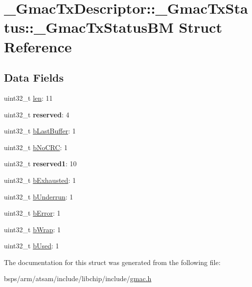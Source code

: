 \hypertarget{struct__GmacTxDescriptor_1_1__GmacTxStatus_1_1__GmacTxStatusBM}{}\section{\+\_\+\+Gmac\+Tx\+Descriptor\+::\+\_\+\+Gmac\+Tx\+Status\+::\+\_\+\+Gmac\+Tx\+Status\+BM Struct Reference}
\label{struct__GmacTxDescriptor_1_1__GmacTxStatus_1_1__GmacTxStatusBM}
\subsection*{Data Fields}
\begin{DoxyCompactItemize}
\item 
uint32\+\_\+t \mbox{\hyperlink{group__gmac__defines_ga6f063648185454976ccc09200fc406b3}{len}}\+: 11
\item 
uint32\+\_\+t {\bfseries reserved}\+: 4
\item 
uint32\+\_\+t \mbox{\hyperlink{group__gmac__defines_ga419cfc782ef1af2872c41d020cb17be7}{b\+Last\+Buffer}}\+: 1
\item 
uint32\+\_\+t \mbox{\hyperlink{group__gmac__defines_ga5f287c86c213afb8d007d7e15b4c0390}{b\+No\+C\+RC}}\+: 1
\item 
uint32\+\_\+t {\bfseries reserved1}\+: 10
\item 
uint32\+\_\+t \mbox{\hyperlink{group__gmac__defines_ga8b6d4be62bda193039d76cd152783867}{b\+Exhausted}}\+: 1
\item 
uint32\+\_\+t \mbox{\hyperlink{group__gmac__defines_ga149c144aad6f6ba23b14b250a3570ff5}{b\+Underrun}}\+: 1
\item 
uint32\+\_\+t \mbox{\hyperlink{group__gmac__defines_gaa5e63eab363bc1c8cc93079e89b85b02}{b\+Error}}\+: 1
\item 
uint32\+\_\+t \mbox{\hyperlink{group__gmac__defines_ga9f84a7eadddc254a2b72d64891fb5cc6}{b\+Wrap}}\+: 1
\item 
uint32\+\_\+t \mbox{\hyperlink{group__gmac__defines_gaf315ceadedbf98decc5af7f1e685fd8b}{b\+Used}}\+: 1
\end{DoxyCompactItemize}


The documentation for this struct was generated from the following file\+:\begin{DoxyCompactItemize}
\item 
bsps/arm/atsam/include/libchip/include/\mbox{\hyperlink{gmac_8h}{gmac.\+h}}\end{DoxyCompactItemize}
